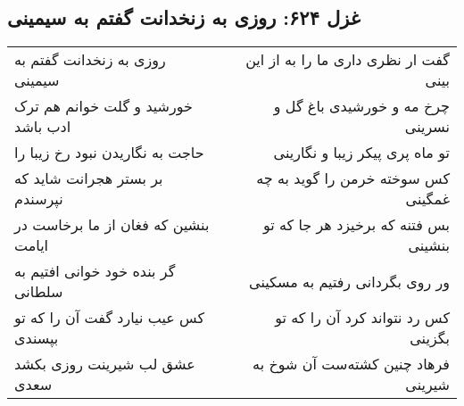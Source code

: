 \begin{center}
\section*{غزل ۶۲۴: روزی به زنخدانت گفتم به سیمینی}
\label{sec:624}
\begin{longtable}{l p{0.5cm} r}
روزی به زنخدانت گفتم به سیمینی
&&
گفت ار نظری داری ما را به از این بینی
\\
خورشید و گلت خوانم هم ترک ادب باشد
&&
چرخ مه و خورشیدی باغ گل و نسرینی
\\
حاجت به نگاریدن نبود رخ زیبا را
&&
تو ماه پری پیکر زیبا و نگارینی
\\
بر بستر هجرانت شاید که نپرسندم
&&
کس سوخته خرمن را گوید به چه غمگینی
\\
بنشین که فغان از ما برخاست در ایامت
&&
بس فتنه که برخیزد هر جا که تو بنشینی
\\
گر بنده خود خوانی افتیم به سلطانی
&&
ور روی بگردانی رفتیم به مسکینی
\\
کس عیب نیارد گفت آن را که تو بپسندی
&&
کس رد نتواند کرد آن را که تو بگزینی
\\
عشق لب شیرینت روزی بکشد سعدی
&&
فرهاد چنین کشته‌ست آن شوخ به شیرینی
\\
\end{longtable}
\end{center}
